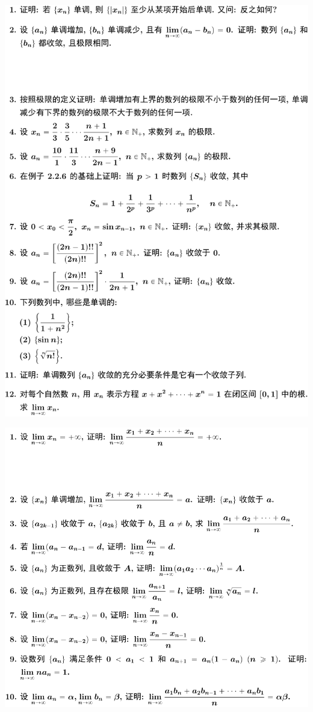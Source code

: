 \documentclass[11pt,a4paper]{ctexart}
\begin{document}
\begin{paracol}{2}
\includegraphics[width=\linewidth]{figure05.png}
\newpage
{}

\includegraphics[width=\linewidth]{figure06.png}
\newpage
{}


\end{paracol}
\end{document}
